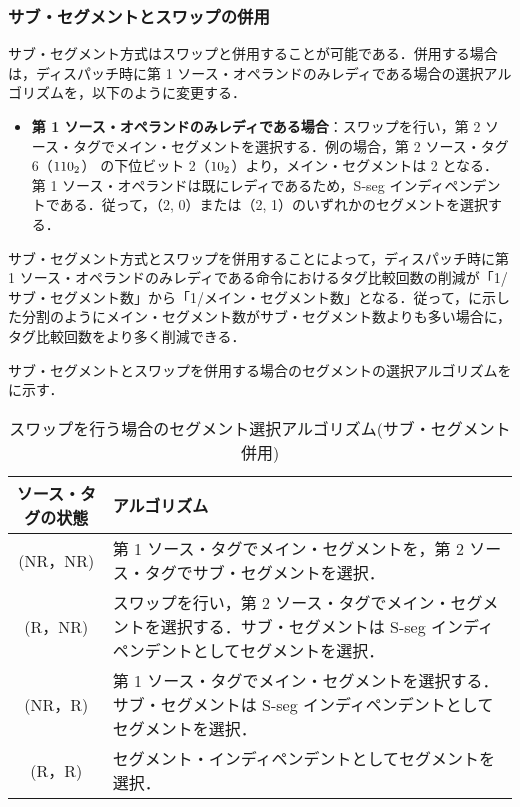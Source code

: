 \subsubsection{サブ・セグメントとスワップの併用}
サブ・セグメント方式はスワップと併用することが可能である．併用する場合は，ディスパッチ時に第 1 ソース・オペランドのみレディである場合の選択アルゴリズムを，以下のように変更する．
\begin{itemize}
  \item \textbf{第 1 ソース・オペランドのみレディである場合}：スワップを行い，第 2 ソース・タグでメイン・セグメントを選択する．例の場合，第 2 ソース・タグ 6（${\rm 110_2}$） の下位ビット 2（${\rm 10_2}$）より，メイン・セグメントは 2 となる．第 1 ソース・オペランドは既にレディであるため，S-seg インディペンデントである．従って，（2, 0）または（2, 1）のいずれかのセグメントを選択する．
\end{itemize}
サブ・セグメント方式とスワップを併用することによって，ディスパッチ時に第 1 ソース・オペランドのみレディである命令におけるタグ比較回数の削減が「1/サブ・セグメント数」から「1/メイン・セグメント数」となる．従って，に示した分割のようにメイン・セグメント数がサブ・セグメント数よりも多い場合に，タグ比較回数をより多く削減できる．

サブ・セグメントとスワップを併用する場合のセグメントの選択アルゴリズムをに示す．

\begin{table}[htb]
  \caption{スワップを行う場合のセグメント選択アルゴリズム(サブ・セグメント併用)}
  \footnotesize
  \center
   \begin{tabular}{|c|p{13cm}|} \hline \hline
    ソース・タグの状態 & アルゴリズム \\ \hline
    (NR，NR) & 第 1 ソース・タグでメイン・セグメントを，第 2 ソース・タグでサブ・セグメントを選択． \\ \hline
    (R，NR) & スワップを行い，第 2 ソース・タグでメイン・セグメントを選択する．サブ・セグメントは S-seg インディペンデントとしてセグメントを選択．\\ \hline
    (NR，R) & 第 1 ソース・タグでメイン・セグメントを選択する．サブ・セグメントは S-seg インディペンデントとしてセグメントを選択．\\ \hline
    (R，R) & セグメント・インディペンデントとしてセグメントを選択． \\ \hline
  \end{tabular}
  \label{tab:agg_algorithm_subseg}
\end{table}








